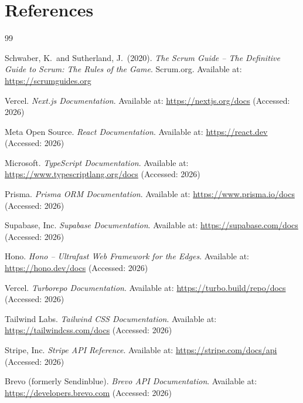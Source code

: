\documentclass[12pt,a4paper]{report}
\begin{document}
\chapter*{References}
{}

\begin{thebibliography}{99}

    Schwaber, K.\ and Sutherland, J.\ (2020).
    \textit{The Scrum Guide -- The Definitive Guide to Scrum: The Rules of the Game}.
    Scrum.org.
    Available at: \url{https://scrumguides.org}

    Vercel.
    \textit{Next.js Documentation}.
    Available at: \url{https://nextjs.org/docs}
    (Accessed: 2026)

    Meta Open Source.
    \textit{React Documentation}.
    Available at: \url{https://react.dev}
    (Accessed: 2026)

    Microsoft.
    \textit{TypeScript Documentation}.
    Available at: \url{https://www.typescriptlang.org/docs}
    (Accessed: 2026)

    Prisma.
    \textit{Prisma ORM Documentation}.
    Available at: \url{https://www.prisma.io/docs}
    (Accessed: 2026)

    Supabase, Inc.
    \textit{Supabase Documentation}.
    Available at: \url{https://supabase.com/docs}
    (Accessed: 2026)

    Hono.
    \textit{Hono -- Ultrafast Web Framework for the Edges}.
    Available at: \url{https://hono.dev/docs}
    (Accessed: 2026)

    Vercel.
    \textit{Turborepo Documentation}.
    Available at: \url{https://turbo.build/repo/docs}
    (Accessed: 2026)

    Tailwind Labs.
    \textit{Tailwind CSS Documentation}.
    Available at: \url{https://tailwindcss.com/docs}
    (Accessed: 2026)

    Stripe, Inc.
    \textit{Stripe API Reference}.
    Available at: \url{https://stripe.com/docs/api}
    (Accessed: 2026)

    Brevo (formerly Sendinblue).
    \textit{Brevo API Documentation}.
    Available at: \url{https://developers.brevo.com}
    (Accessed: 2026)


\end{thebibliography}
\end{document}
